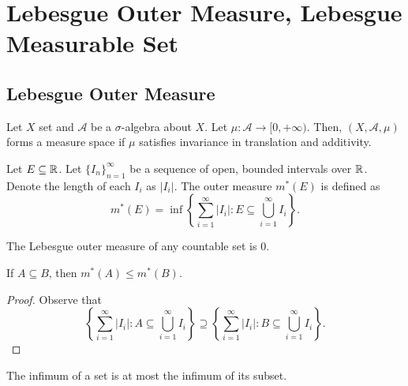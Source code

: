 \documentclass[class=book, crop=false]{standalone}
\begin{document}
    \section{Lebesgue Outer Measure, Lebesgue Measurable Set}
        \subsection{Lebesgue Outer Measure}
        \begin{definition}
            Let $X$ set and $\mathcal{A}$ be a $\sigma$-algebra about $X$. Let $\mu : \mathcal{A} \rightarrow [0, +\infty)$. Then, $(X, \mathcal{A}, \mu)$ forms a measure space if $\mu$ satisfies invariance in translation and additivity.
        \end{definition}

        \begin{definition}
            Let $E \subseteq \mathbb{R}$. Let $\{I_n\}^{\infty}_{n = 1}$ be a sequence of open, bounded intervals over $\mathbb{R}$. Denote the length of each $I_i$ as $|I_i|$. The outer measure $m^*(E)$ is defined as
            \begin{equation*}
                m^*(E) = \inf\left\{\sum^{\infty}_{i = 1} |I_i| : E \subseteq \bigcup^{\infty}_{i = 1} I_i\right\}.
            \end{equation*}
        \end{definition}

        \begin{theorem}
            The Lebesgue outer measure of any countable set is $0$.
        \end{theorem}

        \begin{theorem}[Monotonicity]
            If $A \subseteq B$, then $m^*(A) \leq m^*(B)$.
        \end{theorem}
        \begin{proof}
            Observe that
            \begin{equation*}
                \left\{\sum^{\infty}_{i = 1} |I_i| : A \subseteq \bigcup^{\infty}_{i = 1} I_i\right\} \supseteq \left\{\sum^{\infty}_{i = 1} |I_i| : B \subseteq \bigcup^{\infty}_{i = 1} I_i\right\}.
            \end{equation*}
        \end{proof}
        \begin{remark}
            The infimum of a set is at most the infimum of its subset.
        \end{remark}
\end{document}
